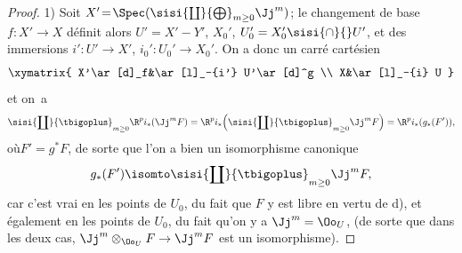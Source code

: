 \begin{proof}
1) Soit $X'\!=\!\Spec(\sisi{\coprod}{\bigoplus}_{m\geq 0}\Jj^m)$; le changement de base \hbox{$f:X'\!\to\! X$} d\'efinit alors $U'=X'- Y'$, $X_0'$, $U_0'=X_0'\sisi{\cap}{} U'$, et des immersions $i':U'\to X'$, \hbox{$i_0':U_0'\to X_0'$}. On a donc un carr\'e cart\'esien
\[
\xymatrix{
X'\ar[d]_f&\ar[l]_-{i'} U'\ar[d]^g \\
X&\ar[l]_-{i} U
}
\]
et on~a
\steco
\begin{equation} \label{eq:XII.19}
\sisi{\coprod}{\tbigoplus}_{m\geq 0}\R^pi_\ast(\Jj^mF) = \R^pi_\ast \Big(\sisi{\coprod}{\tbigoplus}_{m\geq 0} \Jj^mF \Big) =\R^pi_\ast (g_\ast(F')),
\end{equation}
o\`u\pageoriginale $F'=g^\ast F$, de sorte que l'on a bien un isomorphisme canonique
\[
g_\ast(F') \isomto \sisi{\coprod}{\tbigoplus}_{m\geq 0}\Jj^mF,
\]
car c'est vrai en les points de $U_0$, du fait que $F$ y est libre en vertu de d), et \'egalement en les points de $U_0$, du fait qu'on y a $\Jj^m=\Oo_U$, (de sorte que dans les deux cas, $\Jj^m\otimes_{\Oo_U}F\to \Jj^mF$ est un isomorphisme).


\end{proof}
